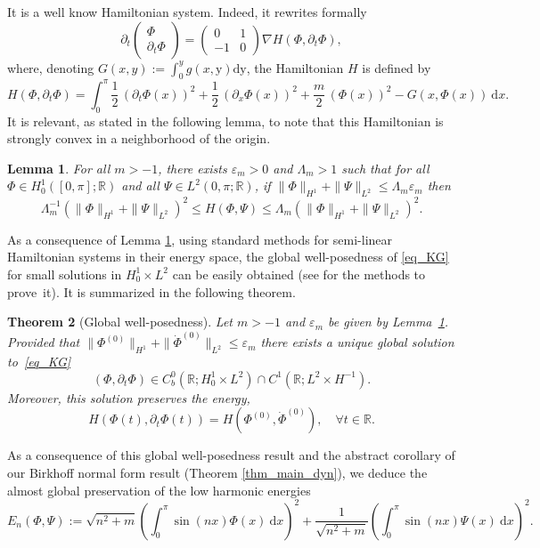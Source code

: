 \documentclass[JEP,XML,SOM,Unicode,NoEqCountersInSection,published]{cedram}
\newtheorem{theorem}{Theorem}[section]
\newtheorem{lemma}[theorem]{Lemma}
\theoremstyle{definition}
\begin{document}
It is a well know Hamiltonian system. Indeed, it rewrites formally
\[
\partial_t \begin{pmatrix} \Phi \\ \partial_t \Phi \end{pmatrix} = \begin{pmatrix} 0 & 1 \\ -1 & 0 \end{pmatrix} \nabla H (\Phi,\partial_t \Phi),
\]
where, denoting $G(x,y):= \int_0^y g(x,\mathrm{y}) \mathrm{d}\mathrm{y}$, the Hamiltonian $H$ is defined by
\[
H(\Phi,\partial_t \Phi) = \int_0^\pi \frac12\,(\partial_t \Phi(x))^2 + \frac12\,(\partial_x \Phi(x))^2+\frac{m}2\, (\Phi(x))^2 - G(x,\Phi(x)) \ \mathrm{d}x.
\]
It is relevant, as stated in the following lemma, to note that this Hamiltonian is strongly convex in a neighborhood of the origin.
\begin{lemma}\label{lemma_Ham_KG_coer} For all $m>-1$, there exists $\varepsilon_m>0$ and $\Lambda_m>1$ such that for all $\Phi\in H^1_0([0,\pi];\mathbb{R})$ and all $\Psi \in L^2(0,\pi;\mathbb{R})$, if $\| \Phi\|_{H^1}+\|\Psi\|_{L^2}\leq \Lambda_m \varepsilon_m$ then
\[
\Lambda_m^{-1}(\| \Phi\|_{H^1}+\|\Psi\|_{L^2})^2 \leq H(\Phi,\Psi)\leq \Lambda_m (\| \Phi\|_{H^1}+\|\Psi\|_{L^2})^2.
\]
\end{lemma}

As a consequence of Lemma \ref{lemma_Ham_KG_coer}, using standard methods for semi-linear Hamiltonian systems in their energy space, the global well-posedness of \eqref{eq_KG} for small solutions in $H^1_0 \times L^2$ can be easily obtained (see \eg \cite{Caz03} for the methods to prove~it). It is summarized in the following theorem.
\begin{theorem}[Global well-posedness]
\label{thm_GWP_KG}
Let $m>-1$ and $\varepsilon_m$ be given by Lemma~\ref{lemma_Ham_KG_coer}. Provided that $\|\Phi^{(0)}\|_{H^1} +\|\dot{\Phi}^{(0)}\|_{ L^2} \leq \varepsilon_m$ there exists a unique global solution to~\eqref{eq_KG}
\[
(\Phi,\partial_t \Phi) \in C^0_b(\mathbb{R}; H^1_0 \times L^2) \cap C^1(\mathbb{R}; L^2 \times H^{-1}).
\]
Moreover, this solution preserves the energy, \ie
\[
H(\Phi(t),\partial_t \Phi(t)) = H(\Phi^{(0)},\dot{\Phi}^{(0)}), \quad \forall t\in \mathbb{R}.
\]
\end{theorem}

As a consequence of this global well-posedness result and the abstract corollary of our Birkhoff normal form result (\ie Theorem \ref{thm_main_dyn}), we deduce the almost global preservation of the low harmonic energies
\[
E_n(\Phi,\Psi):= \sqrt{n^2+m} \left(\int_0^\pi \sin(n x) \Phi(x) \ \mathrm{d}x \right)^2+ \frac1{\sqrt{n^2+m}} \left(\int_0^\pi \sin(n x) \Psi(x) \ \mathrm{d}x \right)^2.
\]
\end{document}
